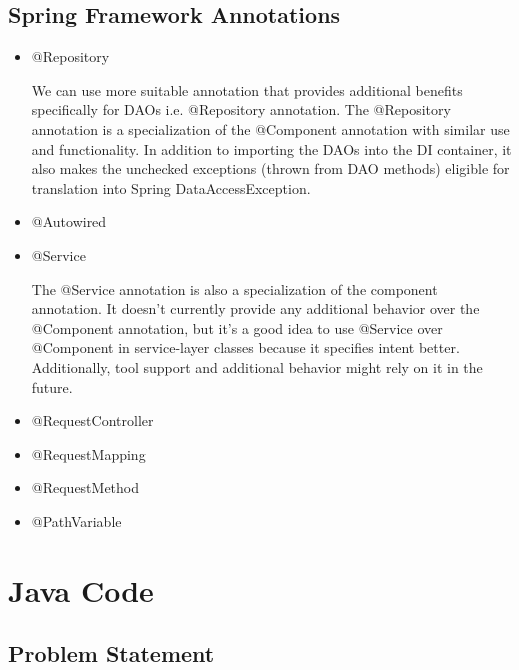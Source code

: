 \documentclass{report}
\begin{document}
	\subsection{Spring Framework Annotations}
	\begin{itemize}
		\item @Repository
		\par We can use more suitable annotation that provides additional benefits specifically for DAOs i.e. @Repository annotation. The @Repository annotation is a specialization of the @Component annotation with similar use and functionality. In addition to importing the DAOs into the DI container, it also makes the unchecked exceptions (thrown from DAO methods) eligible for translation into Spring DataAccessException.
		
		\item @Autowired
		\item @Service
		\par The @Service annotation is also a specialization of the component annotation. It doesn’t currently provide any additional behavior over the @Component annotation, but it’s a good idea to use @Service over @Component in service-layer classes because it specifies intent better. Additionally, tool support and additional behavior might rely on it in the future.
		\item @RequestController
		
		\item @RequestMapping
		\item @RequestMethod
		\item @PathVariable
		  
	\end{itemize}
	\section{Java Code}
	\subsection{Problem Statement}
\end{document}
